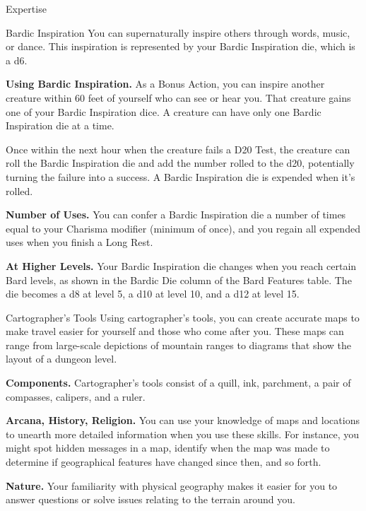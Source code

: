 {\footnotesize \dagger Expertise}
\newpage


\begin{Card}{Bardic Inspiration}
You can supernaturally inspire others through words, music, or dance. This inspiration is represented by your Bardic Inspiration die, which is a d6.

\textbf{Using Bardic Inspiration.} As a Bonus Action, you can inspire another creature within 60 feet of yourself who can see or hear you. That creature gains one of your Bardic Inspiration dice. A creature can have only one Bardic Inspiration die at a time.

Once within the next hour when the creature fails a D20 Test, the creature can roll the Bardic Inspiration die and add the number rolled to the d20, potentially turning the failure into a success. A Bardic Inspiration die is expended when it's rolled.

\textbf{Number of Uses.} You can confer a Bardic Inspiration die a number of times equal to your Charisma modifier (minimum of once), and you regain all expended uses when you finish a Long Rest.

\textbf{At Higher Levels.} Your Bardic Inspiration die changes when you reach certain Bard levels, as shown in the Bardic Die column of the Bard Features table. The die becomes a d8 at level 5, a d10 at level 10, and a d12 at level 15.
\end{Card}

\begin{Card}[card 1 of 2]{Cartographer's Tools}
Using cartographer's tools, you can create accurate maps to make travel
easier for yourself and those who come after you. These maps can range
from large-scale depictions of mountain ranges to diagrams that show the
layout of a dungeon level.

\textbf{Components.} Cartographer's tools consist of a quill, ink,
parchment, a pair of compasses, calipers, and a ruler.

\textbf{Arcana, History, Religion.} You can use your knowledge of maps
and locations to unearth more detailed information when you use these
skills. For instance, you might spot hidden messages in a map, identify
when the map was made to determine if geographical features have changed
since then, and so forth.

\textbf{Nature.} Your familiarity with physical geography makes it
easier for you to answer questions or solve issues relating to the
terrain around you.
\end{Card}

